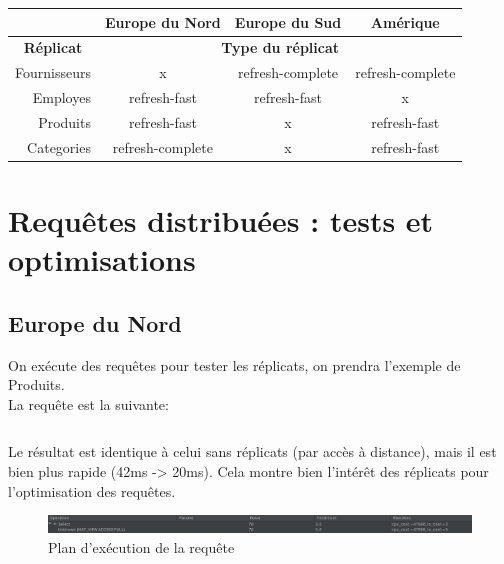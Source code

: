 \documentclass[10pt,a4paper]{article}
\theoremstyle{plain}
\begin{document}
\begin{table}[H]
\begin{tabular}{|r|c|c|c|}
\hline
\multicolumn{1}{|l|}{} & \textbf{Europe du Nord} & \textbf{Europe du Sud} & \textbf{Amérique} \\ \hline
\multicolumn{1}{|c|}{\textbf{Réplicat}} & \multicolumn{3}{c|}{\textbf{Type du réplicat}} \\ \hline
Fournisseurs & x & refresh-complete & refresh-complete \\ \hline
Employes & refresh-fast & refresh-fast & x \\ \hline
Produits & refresh-fast & x & refresh-fast \\ \hline
Categories & refresh-complete & x & refresh-fast \\ \hline
\end{tabular}
\end{table}

\section{Requêtes distribuées : tests et optimisations}

\subsection{Europe du Nord}

On exécute des requêtes pour tester les réplicats, on prendra l'exemple de Produits.\\La requête est la suivante:

\inputminted{sql}{INSA-DB12-EuropeNord-replicats-tests.sql}

Le résultat est identique à celui sans réplicats (par accès à distance), mais il est bien plus rapide (42ms -> 20ms). Cela montre bien l'intérêt des réplicats pour l'optimisation des requêtes.

\begin{figure}[H]
    \centering
    \includegraphics[width=15cm]{INSA-DB12-EuropeNord-plan-exec-vues-replicat-produits.png}
    \caption{Plan d'exécution de la requête}
\end{figure}

\end{document}
